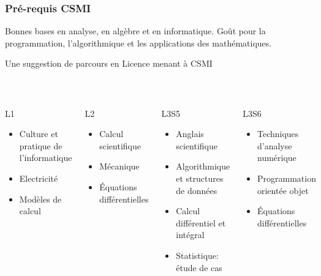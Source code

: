 \begin{frame}
  \frametitle{Pré-requis CSMI}
  \begin{block}{}
    Bonnes bases en analyse, en algèbre et en informatique. 
    Goût pour la programmation, l'algorithmique et les applications des mathématiques.
  \end{block}
  \centerline{Une suggestion de parcours en Licence menant à CSMI}\\[-3mm]
  
  \begin{columns}[t]
    \begin{block}{L1}
      \footnotesize\begin{itemize}
      \item Culture et pratique de l'informatique
      \item Electricité
      \item Modèles de calcul
      \end{itemize}
    \end{block}
    \begin{block}{L2}
      \footnotesize\begin{itemize}
      \item Calcul scientifique
      \item Mécanique
      \item Équations différentielles
      \end{itemize}
    \end{block}
    \begin{block}{L3S5}
      \footnotesize\begin{itemize}
       \item Anglais scientifique
       \item Algorithmique et structures de données 
       \item Calcul différentiel et intégral
       \item Statistique: étude de cas
       \end{itemize}
     \end{block}
     \begin{block}{L3S6}
       \footnotesize\begin{itemize}
       \item Techniques d'analyse numérique
       \item Programmation orientée objet
       \item Équations différentielles
      \end{itemize}
     \end{block}
  \end{columns}

\end{frame}
